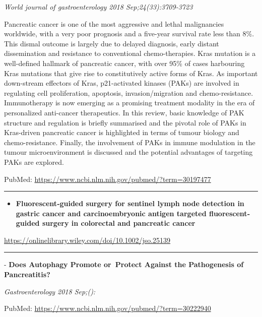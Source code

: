 \documentclass[]{article}
\providecommand{\tightlist}{%
  \setlength{\itemsep}{0pt}\setlength{\parskip}{0pt}}
\begin{document}
\emph{World journal of gastroenterology 2018 Sep;24(33):3709-3723}

Pancreatic cancer is one of the most aggressive and lethal malignancies
worldwide, with a very poor prognosis and a five-year survival rate less
than 8\%. This dismal outcome is largely due to delayed diagnosis, early
distant dissemination and resistance to conventional chemo-therapies.
Kras mutation is a well-defined hallmark of pancreatic cancer, with over
95\% of cases harbouring Kras mutations that give rise to constitutively
active forms of Kras. As important down-stream effectors of Kras,
p21-activated kinases (PAKs) are involved in regulating cell
proliferation, apoptosis, invasion/migration and chemo-resistance.
Immunotherapy is now emerging as a promising treatment modality in the
era of personalized anti-cancer therapeutics. In this review, basic
knowledge of PAK structure and regulation is briefly summarised and the
pivotal role of PAKs in Kras-driven pancreatic cancer is highlighted in
terms of tumour biology and chemo-resistance. Finally, the involvement
of PAKs in immune modulation in the tumour microenvironment is discussed
and the potential advantages of targeting PAKs are explored.

PubMed: \url{https://www.ncbi.nlm.nih.gov/pubmed/?term=30197477}

{}

{}

\begin{center}\rule{0.5\linewidth}{\linethickness}\end{center}

\begin{itemize}
\tightlist
\item
  \textbf{Fluorescent‐guided surgery for sentinel lymph node detection
  in gastric cancer and carcinoembryonic antigen targeted
  fluorescent‐guided surgery in colorectal and pancreatic cancer}
\end{itemize}

\url{https://onlinelibrary.wiley.com/doi/10.1002/jso.25139}

\begin{center}\rule{0.5\linewidth}{\linethickness}\end{center}

 - \textbf{Does Autophagy Promote or~Protect Against the Pathogenesis of
Pancreatitis?}

\emph{Gastroenterology 2018 Sep;():}

PubMed: \url{https://www.ncbi.nlm.nih.gov/pubmed/?term=30222940}
\end{document}
